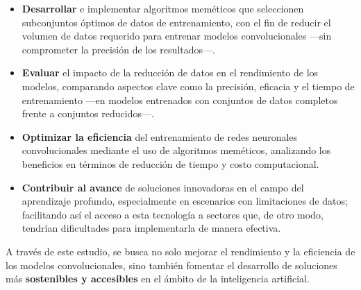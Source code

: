 \begin{itemize}
    \item \textbf{Desarrollar} e implementar algoritmos meméticos que seleccionen subconjuntos óptimos de datos de
entrenamiento, con el fin de reducir el volumen de datos requerido para entrenar modelos convolucionales —sin
comprometer la precisión de los resultados—.
    \item \textbf{Evaluar} el impacto de la reducción de datos en el rendimiento de los modelos, comparando aspectos
clave como la precisión, eficacia y el tiempo de entrenamiento —en modelos entrenados con conjuntos de datos completos
frente a conjuntos reducidos—.
    \item \textbf{Optimizar la eficiencia} del entrenamiento de redes neuronales convolucionales mediante el uso de
algoritmos meméticos, analizando los beneficios en términos de reducción de tiempo y costo computacional.
    \item \textbf{Contribuir al avance} de soluciones innovadoras en el campo del aprendizaje profundo, especialmente
en escenarios con limitaciones de datos; facilitando así el acceso a esta tecnología a sectores que, de otro modo,
tendrían dificultades para implementarla de manera efectiva.
\end{itemize}

A través de este estudio, se busca no solo mejorar el rendimiento y la eficiencia de los modelos convolucionales, sino
también fomentar el desarrollo de soluciones más \textbf{sostenibles y accesibles} en el ámbito de la inteligencia
artificial.